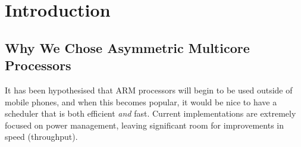 \section{Introduction}
\subsection{Why We Chose Asymmetric Multicore Processors}
It has been hypothesised that ARM processors will begin to be used outside of mobile phones, and when this becomes popular, it would be nice to have a scheduler that is both efficient \textit{and} fast. Current implementations are extremely focused on power management, leaving significant room for improvements in speed (throughput).

